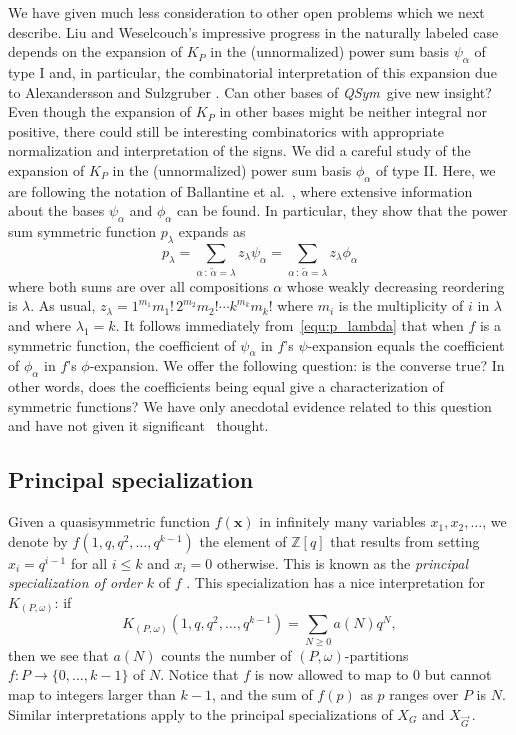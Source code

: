 \documentclass[ALCO,Unicode,published]{cedram}
\newcommand{\diG}{\overrightarrow{G}}
\newcommand{\qsym}{{\it{QSym}}}
\newcommand{\x}{\mathbf{x}}
\newcommand{\om}{\omega}
\newcommand{\kpw}{K_{(P,\om)}}
\begin{document}
We have given much less consideration to other open problems which we next describe.  Liu and Weselcouch's impressive progress in the naturally labeled case \cite{LiWe21} depends on the expansion of $K_P$ in the (unnormalized) power sum basis $\psi_\alpha$ of type I and, in particular, the combinatorial interpretation of this expansion due to Alexandersson and Sulzgruber \cite{AlSu21}.  Can other bases of \qsym\ give new insight?  Even though the expansion of $K_P$ in other bases might be neither integral nor positive, there could still be interesting combinatorics with appropriate normalization and interpretation of the signs.  We did a careful study of the expansion of $K_P$ in the (unnormalized) power sum basis $\phi_\alpha$ of type II.  Here, we are following the notation of Ballantine et al.~\cite{BDHMN20}, where extensive information about the bases $\psi_\alpha$ and $\phi_\alpha$ can be found. In particular, they show that the power sum symmetric function $p_\lambda$ expands as
\begin{equation}\label{equ:p_lambda}
p_\lambda = \sum_{\alpha\,:\,\widetilde{\alpha} = \lambda} z_\lambda \psi_\alpha
= \sum_{\alpha\,:\,\widetilde{\alpha} = \lambda} z_\lambda \phi_\alpha
\end{equation}
where both sums are over all compositions $\alpha$ whose weakly decreasing reordering is $\lambda$. As usual, $z_\lambda = 1^{m_1}m_1!\,2^{m_2}m_2! \cdots k^{m_k}m_k!$ where $m_i$ is the multiplicity of $i$ in $\lambda$ and where $\lambda_1 = k$. It follows immediately from~\eqref{equ:p_lambda} that when $f$ is a symmetric function, the coefficient of $\psi_\alpha$ in $f$'s $\psi$-expansion equals the coefficient of $\phi_\alpha$ in $f$'s $\phi$-expansion.  We offer the following question: is the converse true?  In other words, does the coefficients being equal give a characterization of symmetric functions? We have only anecdotal evidence related to this question and have not given it significant ~thought.

\subsection{Principal specialization}\label{sub:ps}

Given a quasisymmetric function $f(\x)$ in infinitely many variables $x_1, x_2, \ldots$, we denote by $f(1, q, q^2, \ldots, q^{k-1})$ the element of $\mathbb{Z}[q]$ that results from setting $x_i=q^{i-1}$ for all $i \leq k$ and $x_i=0$ otherwise.  This is known as the \emph{principal specialization of order $k$} of $f$ \cite[Sections 7.8, 7.19]{Sta99}.  This specialization has a nice interpretation for $\kpw$: if 
\[
\kpw(1, q, q^2, \ldots, q^{k-1}) = \sum_{N\geq 0} a(N) q^N,
\]
then we see that $a(N)$ counts the number of $(P,\om)$-partitions $f:P \to \{0,\ldots,k-1\}$ of $N$.  Notice that $f$ is now allowed to map to 0 but cannot map to integers larger than $k-1$, and the sum of $f(p)$ as $p$ ranges over $P$ is $N$.  Similar interpretations apply to the principal specializations of $X_G$ and $X_{\diG}$\,.  
\end{document}
